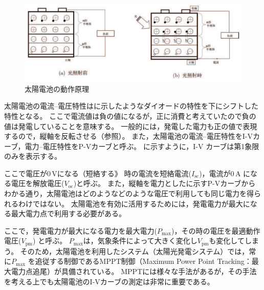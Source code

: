\begin{figure}[htb]
	\centering
	\includegraphics[width=12cm]{./pdfs/fig4.pdf}
	\caption{太陽電池の動作原理}
	\label{fig:fig4}
\end{figure}

太陽電池の電流--電圧特性はに示したようなダイオードの特性を下にシフトした特性となる。
ここで電流値は負の値になるが，正に消費と考えていたので負の値は発電していることを意味する。
一般的には，発電した電力も正の値で表現するので，縦軸を反転させる（参照）。
また，太陽電池の電流--電圧特性をI-Vカーブ，電力--電圧特性をP-Vカーブと呼ぶ。
に示すように，I-V カーブは第1象限のみを表示する。


ここで電圧が0\,Vになる（短絡する》 時の電流を短絡電流($I_{\mathrm{sc}}$)，電流が0\,A になる電圧を解放電圧($V_{\mathrm{oc}}$)と呼ぶ。
また，縦軸を電力としたに示すP-Vカーブからわかる通り，太陽電池はどのようなどのような電圧で利用しても同じ電力を得られるわけではない。
太陽電池を有効に活用するためには，発電電力が最大になる最大電力点で利用する必要がある。

ここで，発電電力が最大になる電力を最大電力($P_{\mathrm{max}}$)，その時の電圧を最適動作電圧($V_{\mathrm{pm}}$) と呼ぶ。
$P_{\mathrm{max}}$は，気象条件によって大きく変化し$V_{\mathrm{pm}}$も変化してしまう。
そのため，太陽電池を利用したシステム（太陽光発電システム）では，常に$P_{\mathrm{max}}$ を追従する制御であるMPPT制御（Maximum Power Point Tracking：最大電力点追尾）が具備されている。
MPPTには様々な手法があるが，その手法を考える上でも太陽電池のI-Vカーブの測定は非常に重要である。

